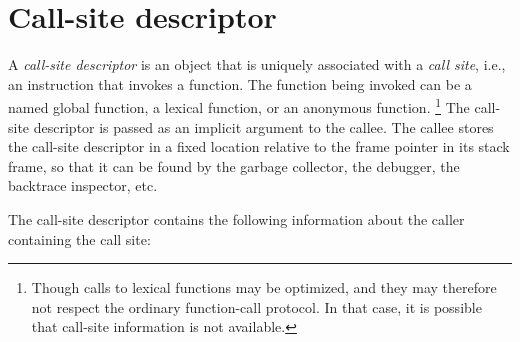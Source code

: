 \section{Call-site descriptor}
\label{sec-call-site-descriptor}

A \emph{call-site descriptor} is an object that is uniquely associated
with a \emph{call site}, i.e., an instruction that invokes a function.
The function being invoked can be a named global function, a lexical
function, or an anonymous function.%
\footnote{Though calls to lexical functions may be optimized, and
  they may therefore not respect the ordinary function-call protocol.
  In that case, it is possible that call-site information is not
  available.}
The call-site descriptor is
passed as an implicit argument to the callee.  The callee stores the
call-site descriptor in a fixed location relative to the frame pointer
in its stack frame, so that it can be found by the garbage collector,
the debugger, the backtrace inspector, etc.

The call-site descriptor contains the following information about the
caller containing the call site:

